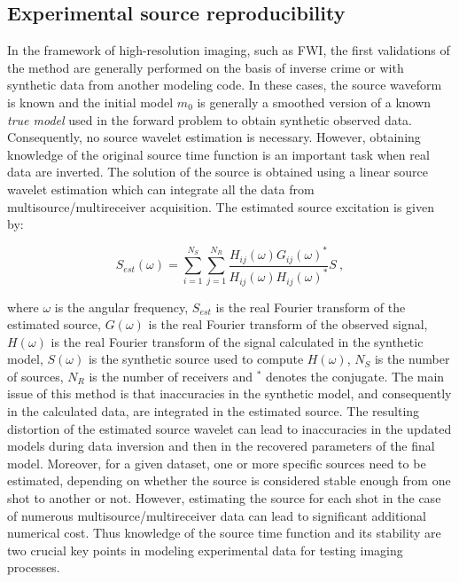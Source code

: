 \documentclass[paper,extra]{gji} %
\begin{document}
\subsection{Experimental source reproducibility}

\noindent In the framework of high-resolution imaging, such as FWI, the first validations of the method are generally performed on the basis of inverse crime or with synthetic data from another modeling code. In these cases, the source waveform is known and the initial model $m_{0}$ is generally a smoothed version of a known \textit{true model} used in the forward problem to obtain synthetic observed data. Consequently, no source wavelet estimation is necessary. However, obtaining knowledge of the original source time function is an important task when real data are inverted. The solution of the source is obtained using a linear source wavelet estimation \citep{Pratt_FWI_1999,Virieux_FWI_2009} which can integrate all the data from multisource/multireceiver acquisition. The estimated source excitation is given by:

\begin{equation}
S_{est}(\omega)=\sum\limits_{i=1}^{N_{S}}\sum\limits_{j=1}^{N_{R}}\frac{H_{ij}(\omega)G_{ij}(\omega)^{*}}{H_{ij}(\omega)H_{ij}(\omega)^{*}}S\ ,
\label{eq:lswe}
\end{equation}

\noindent where $\omega$ is the angular frequency, $S_{est}$ is the real Fourier transform of the estimated source, $G(\omega)$ is the real Fourier transform of the observed signal, $H(\omega)$ is the real Fourier transform of the signal calculated in the synthetic model, $S(\omega)$ is the synthetic source used to compute $H(\omega)$, $N_{S}$ is the number of sources, $N_{R}$ is the number of receivers and $^{*}$ denotes the conjugate. The main issue of this method is that inaccuracies in the synthetic model, and consequently in the calculated data, are integrated in the estimated source. %
The resulting distortion of the estimated source wavelet can lead to inaccuracies in the updated models during data inversion and then in the recovered parameters of the final model. Moreover, for a given dataset, one or more specific sources need to be estimated, depending on whether the source is considered stable enough from one shot to another or not. However, estimating the source for each shot in the case of numerous multisource/multireceiver data can lead to significant additional numerical cost. Thus knowledge of the source time function and its stability are two crucial key points in modeling experimental data for testing imaging processes.
\end{document}
